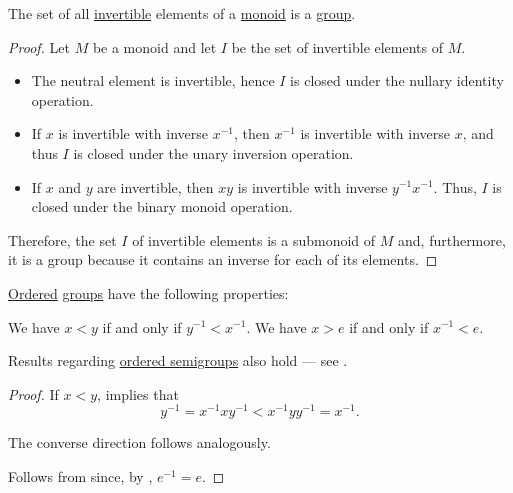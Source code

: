 \begin{proposition}\label{thm:invertible_submonoid_is_group}
  The set of all \hyperref[def:monoid_inverse]{invertible} elements of a \hyperref[def:monoid]{monoid} is a \hyperref[def:group]{group}.
\end{proposition}
\begin{proof}
  Let \( M \) be a monoid and let \( I \) be the set of invertible elements of \( M \).

  \begin{itemize}
    \item The neutral element is invertible, hence \( I \) is closed under the nullary identity operation.
    \item If \( x \) is invertible with inverse \( x^{-1} \), then \( x^{-1} \) is invertible with inverse \( x \), and thus \( I \) is closed under the unary inversion operation.
    \item If \( x \) and \( y \) are invertible, then \( xy \) is invertible with inverse \( y^{-1} x^{-1} \). Thus, \( I \) is closed under the binary monoid operation.
  \end{itemize}

  Therefore, the set \( I \) of invertible elements is a submonoid of \( M \) and, furthermore, it is a group because it contains an inverse for each of its elements.
\end{proof}

\begin{proposition}\label{thm:ordered_group}
  \hyperref[def:ordered_semiring]{Ordered} \hyperref[def:group]{groups} have the following properties:
  \begin{thmenum}
     We have \( x < y \) if and only if \( y^{-1} < x^{-1} \).
     We have \( x > e \) if and only if \( x^{-1} < e \).
  \end{thmenum}
\end{proposition}
\begin{comments}
  \item Results regarding \hyperref[def:ordered_semigroup]{ordered semigroups} also hold --- see .
\end{comments}
\begin{proof}
   If \( x < y \),  implies that
  \begin{equation*}
    y^{-1} = x^{-1} x y^{-1} < x^{-1} y y^{-1} = x^{-1}.
  \end{equation*}

  The converse direction follows analogously.

   Follows from  since, by , \( e^{-1} = e \).
\end{proof}

